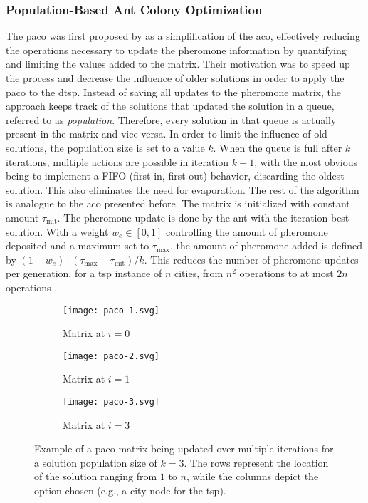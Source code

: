 \subsubsection{Population-Based Ant Colony Optimization}
The \gls{paco} was first proposed by \citet{guntsch2002population} as a simplification of the \gls{aco}, effectively reducing the operations necessary to update the pheromone information by quantifying and limiting the values added to the matrix. Their motivation was to speed up the process and decrease the influence of older solutions in order to apply the \gls{paco} to the \gls{dtsp}. 
Instead of saving all updates to the pheromone matrix, the approach keeps track of the solutions that updated the solution in a queue, referred to as \textit{population}. Therefore, every solution in that queue is actually present in the matrix and vice versa. In order to limit the influence of old solutions, the population size is set to a value $k$. When the queue is full after $k$ iterations, multiple actions are possible in iteration $k+1$, with the most obvious being to implement a FIFO (first in, first out) behavior, discarding the oldest solution. This also eliminates the need for evaporation. The rest of the algorithm is analogue to the \gls{aco} presented before. The matrix is initialized with constant amount $\tau_{\text{init}}$. The pheromone update is done by the ant with the iteration best solution. With a weight $w_e \in [0,1]$ controlling the amount of pheromone deposited and a maximum set to $\tau_{\text{max}}$, the amount of pheromone added is defined by $(1-w_e) \cdot (\tau_{\text{max}} - \tau_{\text{init}})/k$.
This reduces the number of pheromone updates per generation, for a \gls{tsp} instance of $n$ cities, from $n^2$ operations to at most $2n$ operations \cite{guntsch2002population}.

\begin{figure}
	\hfill
	\begin{subfigure}{.3\textwidth}
		\texttt{[image: paco-1.svg]}
		\caption{Matrix at $i=0$}
		\label{fig:paco1}
	\end{subfigure}
	\hfill
	\begin{subfigure}{.3\textwidth}
		\texttt{[image: paco-2.svg]}
		\caption{Matrix at $i=1$}
		\label{fig:paco2}
	\end{subfigure}
	\hfill
	\begin{subfigure}{.3\textwidth}
		\texttt{[image: paco-3.svg]}
		\caption{Matrix at $i=3$}
		\label{fig:paco3}
	\end{subfigure}
	\caption[Example of a \gls{paco} matrix being updated over multiple iterations]{Example of a \gls{paco} matrix being updated over multiple iterations for a solution population size of $k=3$. The rows represent the location of the solution ranging from $1$ to $n$, while the columns depict the option chosen (e.g., a city node for the \gls{tsp}).}
	\label{fig:paco}
\end{figure}

